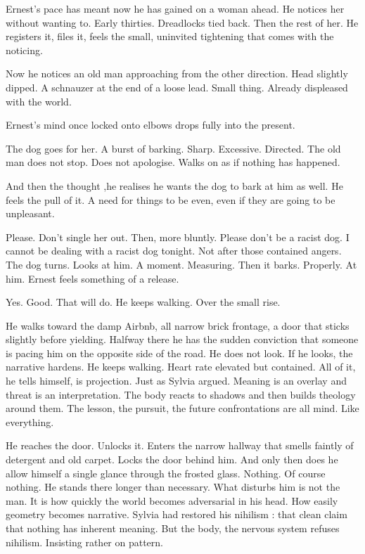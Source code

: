 Ernest's pace has meant now he has gained on a woman ahead. He notices her without wanting to. Early thirties. Dreadlocks tied back. Then the rest of her. He registers it, files it, feels the small, uninvited tightening that comes with the noticing.

Now he notices an old man approaching from the other direction. Head slightly dipped. A schnauzer at the end of a loose lead. Small thing.  Already displeased with the world.

Ernest’s mind once locked onto elbows drops fully into the present.

The dog goes for her. A burst of barking. Sharp. Excessive. Directed. The old man does not stop. Does not apologise. Walks on as if nothing has happened.

And then the thought ,he realises he wants the dog to bark at him as well. He feels the pull of it. A need for things to be even, even if they are going to be unpleasant.

Please. Don’t single her out. Then, more bluntly. Please don’t be a racist dog. I cannot be dealing with a racist dog tonight. Not after those contained angers. The dog turns. Looks at him.
A moment. Measuring. Then it barks. Properly. At him. Ernest feels something of a release.

Yes. Good. That will do. He keeps walking. Over the small rise.

He walks toward the damp Airbnb, all narrow brick frontage, a door that sticks slightly before yielding. Halfway there he has the sudden conviction that someone is pacing him on the opposite side of the road. He does not look. If he looks, the narrative hardens. He keeps walking. Heart rate elevated but contained. All of it, he tells himself, is projection. Just as Sylvia argued. Meaning is an overlay and threat is an interpretation. The body reacts to shadows and then builds theology around them. The lesson, the pursuit, the future confrontations are all mind. Like everything.

He reaches the door. Unlocks it. Enters the narrow hallway that smells faintly of detergent and old carpet. Locks the door behind him. And only then does he allow himself a single glance through the frosted glass. Nothing. Of course nothing. He stands there longer than necessary. What disturbs him is not the man. It is how quickly the world becomes adversarial in his head. How easily geometry becomes narrative. Sylvia had restored his nihilism : that clean claim that nothing has inherent meaning. But the body, the nervous system refuses nihilism. Insisting rather on pattern. 

